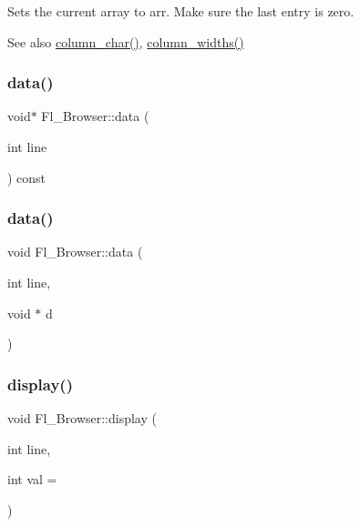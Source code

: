 Sets the current array to {\ttfamily arr}. Make sure the last entry is zero. \begin{DoxySeeAlso}{See also}
\hyperlink{class_fl___browser_ab27dc1a532ccd1c370820229cc1b99f6}{column\+\_\+char()}, \hyperlink{class_fl___browser_a4a473cbb2e5f5d54b63549704a3a0dd0}{column\+\_\+widths()} 
\end{DoxySeeAlso}
\mbox{\label{class_fl___browser_a493579eaccee746b45728aa55851b864}} 
\subsubsection{\texorpdfstring{data()}{data()}\hspace{0.1cm}{\footnotesize\ttfamily [1/2]}}
{\footnotesize\ttfamily void$\ast$ Fl\+\_\+\+Browser\+::data (\begin{DoxyParamCaption}\item[{int}]{line }\end{DoxyParamCaption}) const}

\mbox{\label{class_fl___browser_a92cd0c769bb7a6943883dca34845b29a}} 
\subsubsection{\texorpdfstring{data()}{data()}\hspace{0.1cm}{\footnotesize\ttfamily [2/2]}}
{\footnotesize\ttfamily void Fl\+\_\+\+Browser\+::data (\begin{DoxyParamCaption}\item[{int}]{line,  }\item[{void $\ast$}]{d }\end{DoxyParamCaption})}

\mbox{\label{class_fl___browser_ade1a745e0ceaae412f4365a0057598da}} 
\subsubsection{\texorpdfstring{display()}{display()}}
{\footnotesize\ttfamily void Fl\+\_\+\+Browser\+::display (\begin{DoxyParamCaption}\item[{int}]{line,  }\item[{int}]{val = {} }\end{DoxyParamCaption})}

